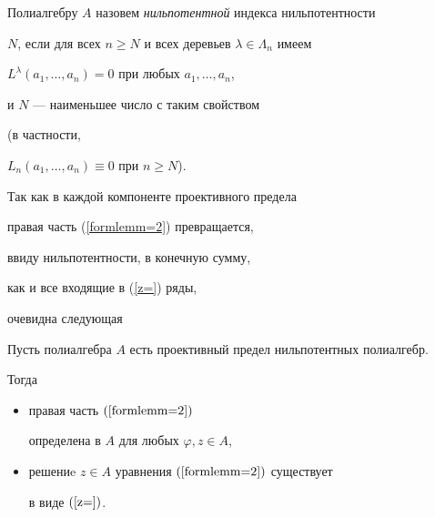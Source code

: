 \begin{defn}


\label{nildef}


Полиалгебру $A$ назовем {\it нильпотентной} индекса нильпотентности


$N$, если для всех $n\geq N$ и всех деревьев $\lambda\in \Lambda_n $ имеем


$L^\lambda(a_1,\dotsc,a_n)=0$ при любых $a_1,\dotsc,a_n$,


и $N$ --- наименьшее число с таким свойством


(в частности,


$L_n(a_1,\dotsc,a_n)\equiv 0$ при $n\geq N$).


\end{defn}





Так как в каждой компоненте проективного предела


правая часть (\ref{formlemm=2}) превращается,


ввиду нильпотентности, в конечную сумму,


как и все входящие в (\ref{z=}) ряды,


очевидна следующая





\begin{lem}


\label{nillemma}


Пусть полиалгебра $A$ есть проективный предел нильпотентных полиалгебр.


Тогда


\begin{itemize}


\item[а)] правая часть $(\ref{formlemm=2})$


определена в $A$ для любых $\varphi,z\in A$,


\item[б)] решениe $z\in A$ уравнения $(\ref{formlemm=2})$ существует


в виде $(\ref{z=})$.


\end{itemize}


\end{lem}





